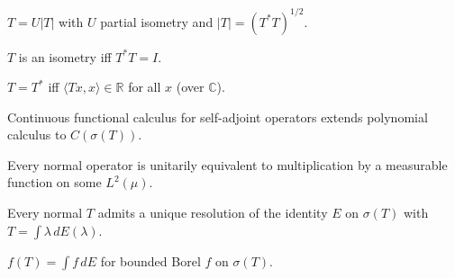 \begin{theorem}
  \label{thm:polar-decomposition}
  \leanok
  $T = U |T|$ with $U$ partial isometry and $|T| = (T^* T)^{1/2}$.
\end{theorem}

\begin{theorem}
  \label{thm:isometry-iff}
  \leanok
  $T$ is an isometry iff $T^* T = I$.
\end{theorem}

\begin{theorem}
  \label{thm:selfAdjoint-realQuadratic}
  \leanok
  $T = T^*$ iff $\langle T x, x \rangle \in \mathbb R$ for all $x$
  (over $\mathbb C$).
\end{theorem}

\begin{theorem}
  \label{thm:cfc-selfAdjoint}
  \leanok
  Continuous functional calculus for self-adjoint operators extends
  polynomial calculus to $C(\sigma(T))$.
\end{theorem}

\begin{theorem}
  \label{thm:spectral-multiplication}
  \leanok
  Every normal operator is unitarily equivalent to multiplication by
  a measurable function on some $L^2(\mu)$.
\end{theorem}

\begin{theorem}
  \label{thm:spectral-resolution}
  \leanok
  Every normal $T$ admits a unique resolution of the identity $E$ on
  $\sigma(T)$ with $T = \int \lambda \, dE(\lambda)$.
\end{theorem}

\begin{theorem}
  \label{thm:borel-fc}
  \leanok
  $f(T) = \int f \, dE$ for bounded Borel $f$ on $\sigma(T)$.
\end{theorem}

